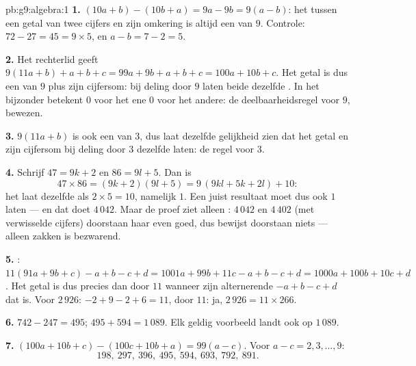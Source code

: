 \begin{solution}{pb:g9:algebra:1}
\textbf{1.} $(10a + b) - (10b + a) = 9a - 9b = 9(a - b)$: het  tussen een
getal van twee cijfers en zijn omkering is altijd een  van $9$. Controle:
$72 - 27 = 45 = 9 \times 5$, en $a - b = 7 - 2 = 5$.

\textbf{2.} Het rechterlid  geeft
$9(11a + b) + a + b + c = 99a + 9b + a + b + c = 100a + 10b + c$. Het getal is dus
een  van $9$ plus zijn cijfersom: bij deling door $9$ laten beide dezelfde
. In het bijzonder betekent  $0$ voor het ene  $0$ voor het andere: de
deelbaarheidsregel voor $9$, bewezen.

\textbf{3.} $9(11a + b)$ is ook een  van $3$, dus laat dezelfde gelijkheid
zien dat het getal en zijn cijfersom bij deling door $3$ dezelfde  laten: de
regel voor $3$.

\textbf{4.} Schrijf $47 = 9k + 2$ en $86 = 9l + 5$. Dan is
\[
47 \times 86 = (9k + 2)(9l + 5)
= 9\,(9kl + 5k + 2l) + 10 :
\]
het  laat dezelfde  als $2 \times 5 = 10$, namelijk $1$. Een juist
resultaat moet dus ook  $1$ laten --- en dat doet $4\,042$. Maar de proef ziet
alleen : $4\,042$ en $4\,402$ (met verwisselde cijfers) doorstaan haar even
goed, dus bewijst doorstaan niets --- alleen zakken is bezwarend.

\textbf{5.} : $11(91a + 9b + c) - a + b - c + d
= 1001a + 99b + 11c - a + b - c + d = 1000a + 100b + 10c + d$. Het getal is dus
precies dan  door $11$ wanneer zijn alternerende  $-a + b - c + d$ dat
is. Voor $2\,926$: $-2 + 9 - 2 + 6 = 11$,  door $11$: ja,
$2\,926 = 11 \times 266$.

\textbf{6.} $742 - 247 = 495$; $495 + 594 = 1\,089$. Elk geldig voorbeeld landt
ook op $1\,089$.

\textbf{7.} $(100a + 10b + c) - (100c + 10b + a) = 99(a - c)$. Voor
$a - c = 2, 3, \dots, 9$:
\[
198,\ 297,\ 396,\ 495,\ 594,\ 693,\ 792,\ 891 .
\]


\end{solution}
